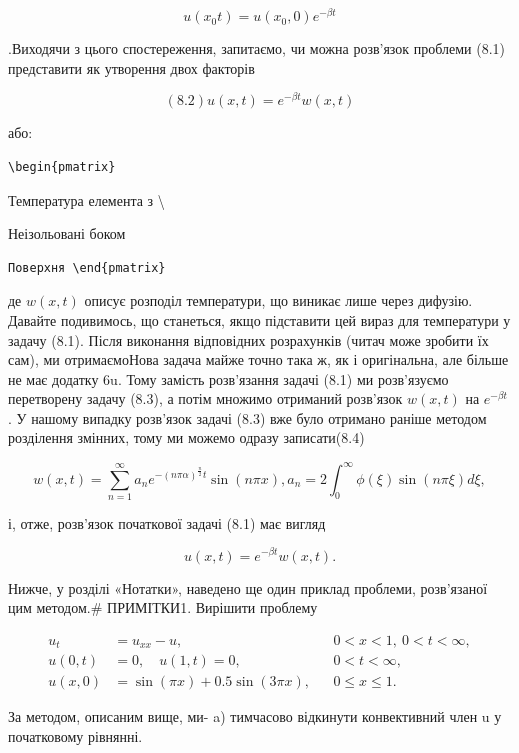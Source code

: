 \documentclass[
  ukrainian,
]{article}
\begin{document}
\[
u(x_0 t) = u(x_0, 0) e^{-\beta t}
\]

.Виходячи з цього спостереження, запитаємо, чи можна розв'язок проблеми
(8.1) представити як утворення двох факторів

\[
(8.2) u(x, t) = e^{-\beta t}w(x, t)
\]

або:

\begin{verbatim}
\begin{pmatrix}
\end{verbatim}

Температура елемента з \textbackslash{}

Неізольовані боком

\begin{verbatim}
Поверхня \end{pmatrix}
\end{verbatim}

де \(w(x, t)\) описує розподіл температури, що виникає лише через
дифузію. Давайте подивимось, що станеться, якщо підставити цей вираз для
температури у задачу (8.1). Після виконання відповідних розрахунків
(читач може зробити їх сам), ми отримаємоНова задача майже точно така ж,
як і оригінальна, але більше не має додатку 6u. Тому замість розв'язання
задачі (8.1) ми розв'язуємо перетворену задачу (8.3), а потім множимо
отриманий розв'язок \(w(x, t)\) на \(e^{-\beta t}\) . У нашому випадку
розв'язок задачі (8.3) вже було отримано раніше методом розділення
змінних, тому ми можемо одразу записати(8.4)

\[
w(x, t) = \sum_{n=1}^{\infty} a_n e^{-(n\pi\alpha)^{\frac{n}{2}}t} \sin(n\pi x),
a_n = 2 \int_0^{\infty} \phi(\xi) \sin(n\pi \xi) d\xi,
\]

і, отже, розв'язок початкової задачі (8.1) має вигляд

\[
u(x, t) = e^{-\beta t}w(x, t).
\]

Нижче, у розділі «Нотатки», наведено ще один приклад проблеми,
розв'язаної цим методом.\# ПРИМІТКИ1. Вирішити проблему

\[
\begin{aligned}
u_t &= u_{xx} - u, && 0 < x < 1,\ 0 < t < \infty, \\
u(0,t) &= 0,\quad u(1,t) = 0, && 0 < t < \infty, \\
u(x,0) &= \sin(\pi x) + 0.5\sin(3\pi x), && 0 \leqslant x \leqslant 1.
\end{aligned}
\]

За методом, описаним вище, ми- a) тимчасово відкинути конвективний член
u у початковому рівнянні.
\end{document}

